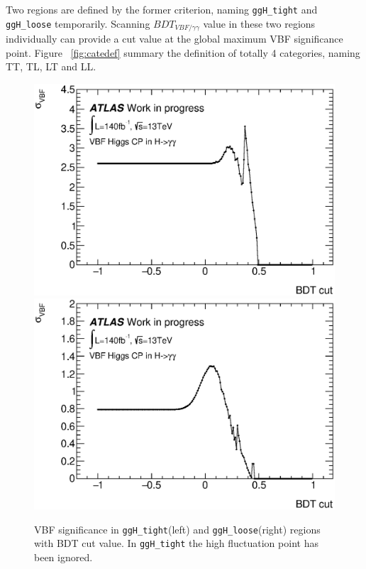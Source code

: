 Two regions are defined by the former criterion, naming \texttt{ggH\_tight} and \texttt{ggH\_loose} temporarily. Scanning $BDT_{VBF/\gamma\gamma}$ value in these two regions individually can provide a cut value at the global maximum VBF significance point. Figure ~\ref{fig:catedef} summary the definition of totally 4 categories, naming TT, TL, LT and LL. \\

\begin{figure}[tbp]
  \centering
  \includegraphics[width=0.45\linewidth]{figure/BDT/vbfsig_tight.eps}
  \includegraphics[width=0.45\linewidth]{figure/BDT/vbfsig_loose.eps}
  \caption{VBF significance in \texttt{ggH\_tight}(left) and \texttt{ggH\_loose}(right) regions with BDT cut value. In \texttt{ggH\_tight} the high fluctuation point has been ignored. }
  \label{fig:vbfsignificance}
\end{figure}

